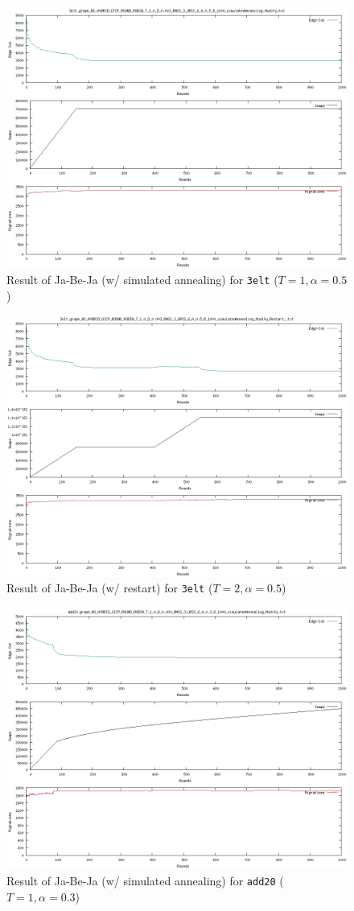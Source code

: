 \documentclass[]{article}
\begin{document}
\begin{figure}[!h]
    \centering
    \includegraphics[width=.5\textwidth]{../task2/3elt.graph_NS_HYBRID_GICP_ROUND_ROBIN_T_1.0_D_0.003_RNSS_3_URSS_6_A_0.5_R_1000_simulatedAnnealing_Modify.txt.png}
    \caption{Result of Ja-Be-Ja (w/ simulated annealing) for \texttt{3elt} ($T=1, \alpha=0.5$)}
\end{figure}


\begin{figure}[!h]
    \centering
    \includegraphics[width=.5\textwidth]{../task2/3elt.graph_NS_HYBRID_GICP_ROUND_ROBIN_T_1.0_D_0.003_RNSS_3_URSS_6_A_0.5_R_1000_simulatedAnnealing_Modify_Restart_.txt.png}
    \caption{Result of Ja-Be-Ja (w/ restart) for \texttt{3elt} ($T=2, \alpha=0.5$)}
\end{figure}

\pagebreak

\begin{figure}[!h]
    \centering
    \includegraphics[width=.5\textwidth]{../task2/add20.graph_NS_HYBRID_GICP_ROUND_ROBIN_T_1.0_D_0.003_RNSS_3_URSS_6_A_0.3_R_1000_simulatedAnnealing_Modify.txt.png}
    \caption{Result of Ja-Be-Ja (w/ simulated annealing) for \texttt{add20} ($T=1, \alpha=0.3$)}
\end{figure}
\end{document}
